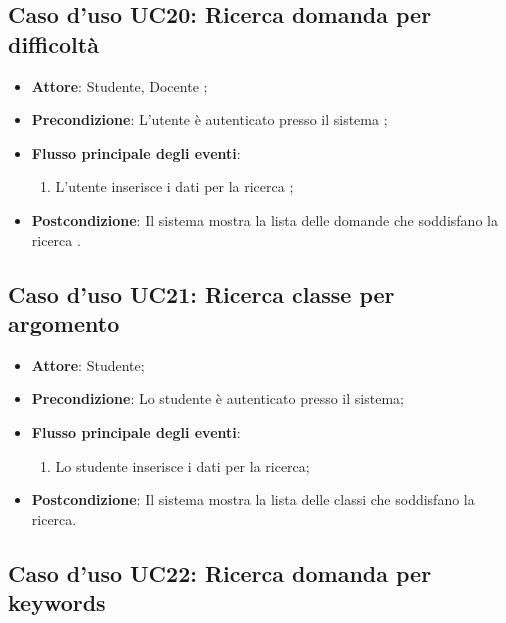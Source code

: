 \documentclass[12pt,a4paper]{article}
\begin{document}
\subsection{Caso d'uso UC20: Ricerca domanda per difficoltà}

\begin{itemize}

\item \textbf{Attore}: Studente, Docente
; 
\item \textbf{Precondizione}: L'utente è autenticato presso il sistema
;

\item \textbf{Flusso principale degli eventi}:
\begin{enumerate}
	\item L'utente inserisce i dati per la ricerca	;
	
\end{enumerate}
\item \textbf{Postcondizione}: Il sistema mostra la lista delle domande che soddisfano la ricerca
.
\end{itemize}
\hypertarget{UC21}{}
\subsection{Caso d'uso UC21: Ricerca classe per argomento}

\begin{itemize}

\item \textbf{Attore}: Studente; 
\item \textbf{Precondizione}: Lo studente è autenticato presso il sistema;

\item \textbf{Flusso principale degli eventi}:
\begin{enumerate}
	\item Lo studente inserisce i dati per la ricerca;
	
\end{enumerate}
\item \textbf{Postcondizione}: Il sistema mostra la lista delle classi che soddisfano la ricerca.
\end{itemize}
\hypertarget{UC22}{}
\subsection{Caso d'uso UC22: Ricerca domanda per keywords}
\end{document}
